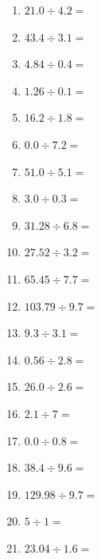 \documentclass[12pt]{article}
\begin{document}
\begin{enumerate}
\item \large $ 21.0 \div 4.2 = $ \vspace{1.5cm}
\item \large $ 43.4 \div 3.1 = $ \vspace{1.5cm}
\item \large $ 4.84 \div 0.4 = $ \vspace{1.5cm}
\item \large $ 1.26 \div 0.1 = $ \vspace{1.5cm}
\item \large $ 16.2 \div 1.8 = $ \vspace{1.5cm}
\newpage
\item \large $ 0.0 \div 7.2 = $ \vspace{1.5cm}
\item \large $ 51.0 \div 5.1 = $ \vspace{1.5cm}
\item \large $ 3.0 \div 0.3 = $ \vspace{1.5cm}
\item \large $ 31.28 \div 6.8 = $ \vspace{1.5cm}
\item \large $ 27.52 \div 3.2 = $ \vspace{1.5cm}
\item \large $ 65.45 \div 7.7 = $ \vspace{1.5cm}
\item \large $ 103.79 \div 9.7 = $ \vspace{1.5cm}
\item \large $ 9.3 \div 3.1 = $ \vspace{1.5cm}
\item \large $ 0.56 \div 2.8 = $ \vspace{1.5cm}
\item \large $ 26.0 \div 2.6 = $ \vspace{1.5cm}
\newpage
\item \large $ 2.1 \div 7 = $ \vspace{1.5cm}
\item \large $ 0.0 \div 0.8 = $ \vspace{1.5cm}
\item \large $ 38.4 \div 9.6 = $ \vspace{1.5cm}
\item \large $ 129.98 \div 9.7 = $ \vspace{1.5cm}
\item \large $ 5 \div 1 = $ \vspace{1.5cm}
\item \large $ 23.04 \div 1.6 = $ \vspace{1.5cm}

\end{enumerate}
\end{document}
